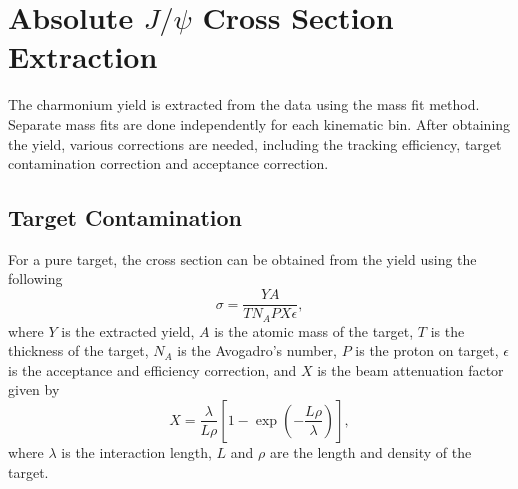 \documentclass[../main.tex]{subfiles}
\begin{document}
\section{Absolute \texorpdfstring{$J/\psi$}{J/psi} Cross Section Extraction}
The charmonium yield is extracted from the data using the mass fit method.
Separate mass fits are done independently for each kinematic bin. After obtaining
the yield, various corrections are needed, including the tracking efficiency, target
contamination correction and acceptance correction.
\subsection{Target Contamination}
\label{subsec:contamination}
For a pure target, the cross section can be obtained from the yield using the following
\begin{equation}
	\sigma = \frac{Y A}{T N_A P X \epsilon},
\end{equation}
where $Y$ is the extracted yield, $A$ is the atomic mass of the target,
$T$ is the thickness of the target, $N_A$ is the Avogadro’s number,
$P$ is the proton on target, $\epsilon$ is the acceptance and efficiency correction,
and $X$ is the beam attenuation factor given by
\begin{equation}
	X=\frac{\lambda}{L\rho} \left[1-\exp\left(-\frac{L\rho}{\lambda}\right)\right],
\end{equation}
where $\lambda$ is the interaction length, $L$ and $\rho$ are the length and density
of the target.
\end{document}
